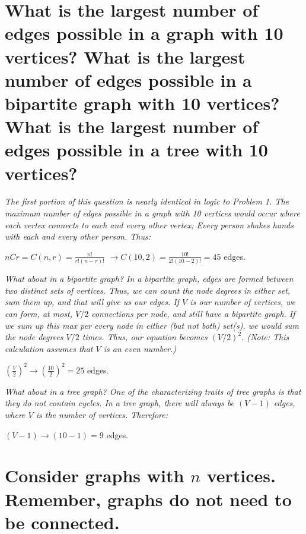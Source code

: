 \documentclass{article}
\begin{document}

\section{What is the largest number of edges possible in a graph with 10 vertices?
    What is the largest number of edges possible in a bipartite graph with 10 vertices?
    What is the largest number of edges possible in a tree with 10 vertices?}
\hspace{1cm}\textit{The first portion of this question is nearly identical in logic to 
    Problem 1. The maximum number of edges possible in a graph with 10 vertices would occur
    where each vertex connects to each and every other vertex; Every person shakes
    hands with each and every other person. Thus:}
\begin{center}
    \large{$nCr = C(n,r) = \frac{n!}{r!(n-r)!}$}
    \large{$\xrightarrow{} C(10,2) = \frac{10!}{2!(10-2)!}
        = 45$ edges.} \\
\end{center}
\hspace{1cm}\textit{What about in a bipartite graph? In a bipartite graph, edges are formed
    between two distinct sets of
    vertices. Thus, we can count the node degrees in either
    set, sum them up, and that will give us our edges. If $V$ is our number of vertices, 
    we can form, at most, $V/2$ connections per node, and still have a bipartite graph.
    If we sum up this max per every node in either (but not both) set(s), we would sum the node
    degrees $V/2$ times. Thus, our equation becomes $(V/2)^2$. (Note: This calculation assumes
    that $V$ is an even number.)}
\begin{center}
    \large{$(\frac{V}{2})^2 \xrightarrow{} (\frac{10}{2})^2 = 25$ edges.} \\
\end{center}
\hspace{1cm}\textit{What about in a tree graph? One of the characterizing traits of tree graphs is that 
they do not contain cycles. In a tree graph, there will always be $(V-1)$ edges, where $V$ is
the number of vertices. Therefore:}
\begin{center}
    \large{$(V-1) \xrightarrow{} (10-1) = 9$ edges.} \\
\end{center}
\clearpage


\section{Consider graphs with $n$ vertices. Remember, graphs do not need to be connected.}
\end{document}
